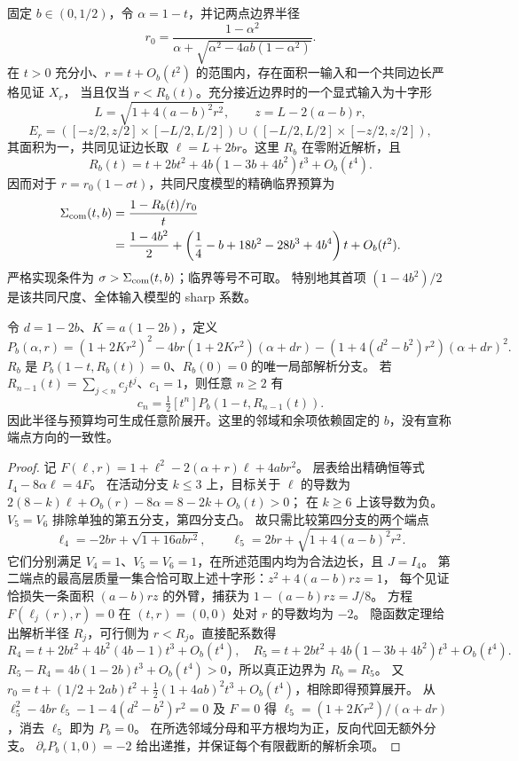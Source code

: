 \begin{theorem}[共同尺度的精确局部边界及全阶递推]\label{cs:sharp}
固定 $b\in(0,1/2)$，令 $\alpha=1-t$，并记两点边界半径
\[
 r_0=\frac{1-\alpha^2}{\alpha+\sqrt{\alpha^2-4ab(1-\alpha^2)}}.
\]
在 $t>0$ 充分小、$r=t+O_b(t^2)$ 的范围内，存在面积一输入和一个共同边长严格见证 $X_r$，
当且仅当 $r<R_b(t)$。充分接近边界时的一个显式输入为十字形
\[
 L=\sqrt{1+4(a-b)^2r^2},\qquad z=L-2(a-b)r,
\]
\[
 E_r=([-z/2,z/2]\times[-L/2,L/2])\cup([-L/2,L/2]\times[-z/2,z/2]),
\]
其面积为一，共同见证边长取 $\ell=L+2br$。这里 $R_b$ 在零附近解析，且
\[
 R_b(t)=t+2bt^2+4b(1-3b+4b^2)t^3+O_b(t^4).
\]
因而对于 $r=r_0(1-\sigma t)$，共同尺度模型的精确临界预算为
\begin{align*}
 \Sigma_{\rm com}(t,b)&=\frac{1-R_b(t)/r_0}{t}\\
 &=\frac{1-4b^2}{2}
   +\left(\frac14-b+18b^2-28b^3+4b^4\right)t+O_b(t^2).
\end{align*}
严格实现条件为 $\sigma>\Sigma_{\rm com}(t,b)$；临界等号不可取。
特别地其首项 $(1-4b^2)/2$ 是该共同尺度、全体输入模型的 sharp 系数。

令 $d=1-2b$、$K=a(1-2b)$，定义
\[
 P_b(\alpha,r)=(1+2Kr^2)^2-4br(1+2Kr^2)(\alpha+dr)
                  -(1+4(d^2-b^2)r^2)(\alpha+dr)^2.
\]
$R_b$ 是 $P_b(1-t,R_b(t))=0$、$R_b(0)=0$ 的唯一局部解析分支。
若 $R_{n-1}(t)=\sum_{j<n}c_jt^j$、$c_1=1$，则任意 $n\ge2$ 有
\[
 c_n=\tfrac12[t^n]P_b(1-t,R_{n-1}(t)).
\]
因此半径与预算均可生成任意阶展开。这里的邻域和余项依赖固定的 $b$，没有宣称端点方向的一致性。
\end{theorem}
\begin{proof}
记 $F(\ell,r)=1+\ell^2-2(\alpha+r)\ell+4abr^2$。
层表给出精确恒等式 $I_4-8\alpha\ell=4F$。
在活动分支 $k\le3$ 上，目标关于 $\ell$ 的导数为
$2(8-k)\ell+O_b(r)-8\alpha=8-2k+O_b(t)>0$；
在 $k\ge6$ 上该导数为负。
$V_5=V_6$ 排除单独的第五分支，第四分支凸。
故只需比较第四分支的两个端点
\[
 \ell_4=-2br+\sqrt{1+16abr^2},\qquad
 \ell_5=2br+\sqrt{1+4(a-b)^2r^2}.
\]
它们分别满足 $V_4=1$、$V_5=V_6=1$，在所述范围内均为合法边长，且 $J=I_4$。
第二端点的最高层质量一集合恰可取上述十字形：$z^2+4(a-b)rz=1$，
每个见证恰损失一条面积 $(a-b)rz$ 的外臂，捕获为 $1-(a-b)rz=J/8$。
方程 $F(\ell_j(r),r)=0$ 在 $(t,r)=(0,0)$ 处对 $r$ 的导数均为 $-2$。
隐函数定理给出解析半径 $R_j$，可行侧为 $r<R_j$。直接配系数得
\[
 R_4=t+2bt^2+4b^2(4b-1)t^3+O_b(t^4),\quad
 R_5=t+2bt^2+4b(1-3b+4b^2)t^3+O_b(t^4).
\]
$R_5-R_4=4b(1-2b)t^3+O_b(t^4)>0$，所以真正边界为 $R_b=R_5$。
又 $r_0=t+(1/2+2ab)t^2+\tfrac12(1+4ab)^2t^3+O_b(t^4)$，相除即得预算展开。
从 $\ell_5^2-4br\ell_5-1-4(d^2-b^2)r^2=0$ 及 $F=0$ 得
$\ell_5=(1+2Kr^2)/(\alpha+dr)$，消去 $\ell_5$ 即为 $P_b=0$。
在所选邻域分母和平方根均为正，反向代回无额外分支。
$\partial_rP_b(1,0)=-2$ 给出递推，并保证每个有限截断的解析余项。
\end{proof}

